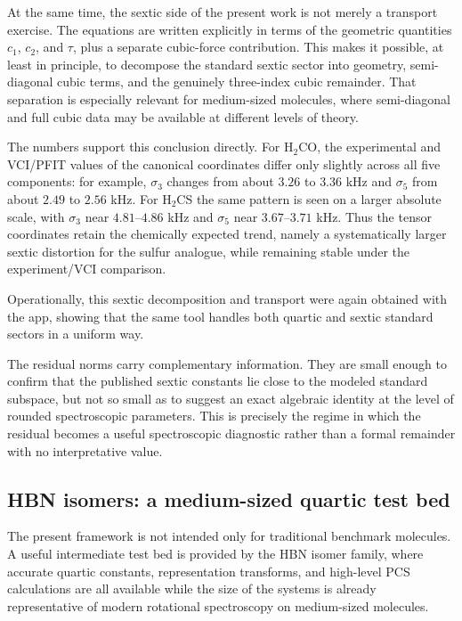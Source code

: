 At the same time, the sextic side of the present work is not merely a
transport exercise. The equations are written explicitly in terms of the
geometric quantities $c_1$, $c_2$, and $\tau$, plus a separate cubic-force
contribution. This makes it possible, at least in principle, to decompose the
standard sextic sector into geometry, semi-diagonal cubic terms, and the
genuinely three-index cubic remainder. That separation is especially relevant
for medium-sized molecules, where semi-diagonal and full cubic data may be
available at different levels of theory.

The numbers support this conclusion directly. For H$_2$CO, the experimental
and VCI/PFIT values of the canonical coordinates differ only slightly across
all five components: for example, $\sigma_3$ changes from about $3.26$ to
$3.36$ kHz and $\sigma_5$ from about $2.49$ to $2.56$ kHz. For H$_2$CS the
same pattern is seen on a larger absolute scale, with $\sigma_3$ near
$4.81$--$4.86$ kHz and $\sigma_5$ near $3.67$--$3.71$ kHz. Thus the tensor
coordinates retain the chemically expected trend, namely a systematically
larger sextic distortion for the sulfur analogue, while remaining stable under
the experiment/VCI comparison.

Operationally, this sextic decomposition and transport were again obtained
with the app, showing that the same tool handles both quartic and sextic
standard sectors in a uniform way.

The residual norms carry complementary information. They are small enough to
confirm that the published sextic constants lie close to the modeled standard
subspace, but not so small as to suggest an exact algebraic identity at the
level of rounded spectroscopic parameters. This is precisely the regime in
which the residual becomes a useful spectroscopic diagnostic rather than a
formal remainder with no interpretative value.

\subsection{HBN isomers: a medium-sized quartic test bed}

The present framework is not intended only for traditional benchmark
molecules. A useful intermediate test bed is provided by the HBN isomer
family, where accurate quartic constants, representation transforms, and
high-level PCS calculations are all available while the size of the systems is
already representative of modern rotational spectroscopy on medium-sized
molecules.

